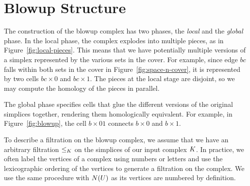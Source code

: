\section{Blowup Structure}
\label{sec:blowup_structure}
The construction of the blowup complex has two phases,  the \emph{local} and the
 \emph{global} phase. In the local phase, the complex explodes into multiple 
pieces, as in Figure~\ref{fig:local-pieces}. This means that we have potentially multiple versions of a simplex 
represented by the various sets in the cover. For example, since edge $bc$ falls within both sets in the 
cover in Figure~\ref{fig:space-n-cover}, it is represented by two cells 
$bc \times 0$ and $bc \times 1$. The pieces at the local stage are disjoint, so 
we may compute the homology of the pieces in parallel. 

The global phase specifies cells that glue the different versions of the 
original simplices together, rendering them homologically equivalent.  
For example, in Figure~\ref{fig:blowup}, the cell 
$b \times 01$ connects $b \times 0$ and $b \times 1$.  

To describe a filtration on the blowup complex, we assume that we have an 
arbitrary filtration $\leq_{K}$ on the simplices of our input complex $K$.  In practice, 
we often label the vertices of a complex using numbers or letters and use the lexicographic 
ordering of the vertices to generate a filtration on the complex. We use the same procedure 
with $N(U)$ as its vertices are numbered by definition.

